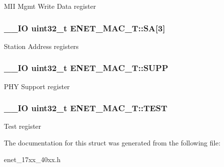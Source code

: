 M\+I\+I Mgmt Write Data register \hypertarget{struct_e_n_e_t___m_a_c___t_a25214ef3698b23b87fea95b7158a11ad}{
\subsubsection[{S\+A}]{\setlength{\rightskip}{0pt plus 5cm}\+\_\+\+\_\+\+I\+O uint32\+\_\+t E\+N\+E\+T\+\_\+\+M\+A\+C\+\_\+\+T\+::\+S\+A\mbox{[}3\mbox{]}}}\label{struct_e_n_e_t___m_a_c___t_a25214ef3698b23b87fea95b7158a11ad}
Station Address registers \hypertarget{struct_e_n_e_t___m_a_c___t_ad7232a883f980074136d81f8a15d8bb5}{
\subsubsection[{S\+U\+P\+P}]{\setlength{\rightskip}{0pt plus 5cm}\+\_\+\+\_\+\+I\+O uint32\+\_\+t E\+N\+E\+T\+\_\+\+M\+A\+C\+\_\+\+T\+::\+S\+U\+P\+P}}\label{struct_e_n_e_t___m_a_c___t_ad7232a883f980074136d81f8a15d8bb5}
P\+H\+Y Support register \hypertarget{struct_e_n_e_t___m_a_c___t_a3ba308b4a368f475aa4b2136faa88f6f}{
\subsubsection[{T\+E\+S\+T}]{\setlength{\rightskip}{0pt plus 5cm}\+\_\+\+\_\+\+I\+O uint32\+\_\+t E\+N\+E\+T\+\_\+\+M\+A\+C\+\_\+\+T\+::\+T\+E\+S\+T}}\label{struct_e_n_e_t___m_a_c___t_a3ba308b4a368f475aa4b2136faa88f6f}
Test register 

The documentation for this struct was generated from the following file\+:\begin{DoxyCompactItemize}
\item 
enet\+\_\+17xx\+\_\+40xx.\+h\end{DoxyCompactItemize}
